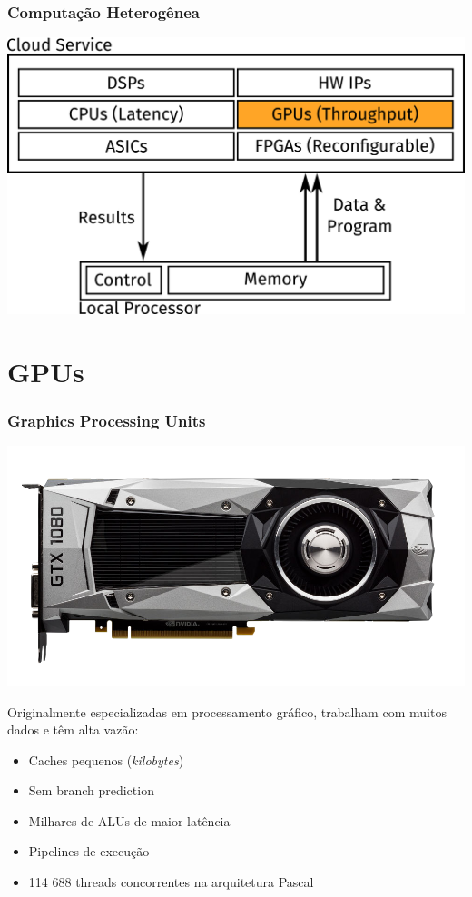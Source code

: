 \documentclass[10pt, compress]{beamer}
\begin{document}
\begin{frame}
    \frametitle{Computação Heterogênea}
    \centering
    \includegraphics[width=.85\textwidth]{heterogeneous_highlight}
\end{frame}

\section{GPUs}

\begin{frame}
    \frametitle{Graphics Processing Units}
    \begin{center}
        \includegraphics[width=.6\textwidth]{gtx1080}
    \end{center}
    \pause

    Originalmente especializadas em \alert{processamento gráfico},
    trabalham com muitos dados e têm \alert{alta vazão}:
    \pause

    \begin{itemize}
        \item Caches pequenos (\textit{kilobytes})
            \pause
        \item Sem \alert{branch prediction}
            \pause
        \item \alert{Milhares} de ALUs de \alert{maior latência}
            \pause
        \item \alert{Pipelines} de execução
            \pause
        \item 114 688 \alert{threads} concorrentes na arquitetura Pascal
    \end{itemize}
\end{frame}
\end{document}
